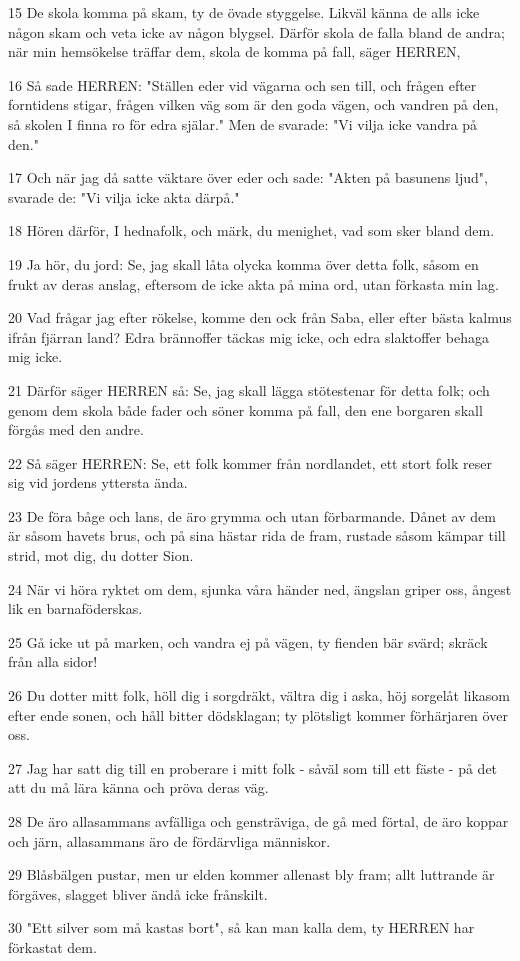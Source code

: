\par 15 De skola komma på skam, ty de övade styggelse. Likväl känna de alls icke någon skam och veta icke av någon blygsel. Därför skola de falla bland de andra; när min hemsökelse träffar dem, skola de komma på fall, säger HERREN,
\par 16 Så sade HERREN: "Ställen eder vid vägarna och sen till, och frågen efter forntidens stigar, frågen vilken väg som är den goda vägen, och vandren på den, så skolen I finna ro för edra själar." Men de svarade: "Vi vilja icke vandra på den."
\par 17 Och när jag då satte väktare över eder och sade: "Akten på basunens ljud", svarade de: "Vi vilja icke akta därpå."
\par 18 Hören därför, I hednafolk, och märk, du menighet, vad som sker bland dem.
\par 19 Ja hör, du jord: Se, jag skall låta olycka komma över detta folk, såsom en frukt av deras anslag, eftersom de icke akta på mina ord, utan förkasta min lag.
\par 20 Vad frågar jag efter rökelse, komme den ock från Saba, eller efter bästa kalmus ifrån fjärran land? Edra brännoffer täckas mig icke, och edra slaktoffer behaga mig icke.
\par 21 Därför säger HERREN så: Se, jag skall lägga stötestenar för detta folk; och genom dem skola både fader och söner komma på fall, den ene borgaren skall förgås med den andre.
\par 22 Så säger HERREN: Se, ett folk kommer från nordlandet, ett stort folk reser sig vid jordens yttersta ända.
\par 23 De föra båge och lans, de äro grymma och utan förbarmande. Dånet av dem är såsom havets brus, och på sina hästar rida de fram, rustade såsom kämpar till strid, mot dig, du dotter Sion.
\par 24 När vi höra ryktet om dem, sjunka våra händer ned, ängslan griper oss, ångest lik en barnaföderskas.
\par 25 Gå icke ut på marken, och vandra ej på vägen, ty fienden bär svärd; skräck från alla sidor!
\par 26 Du dotter mitt folk, höll dig i sorgdräkt, vältra dig i aska, höj sorgelåt likasom efter ende sonen, och håll bitter dödsklagan; ty plötsligt kommer förhärjaren över oss.
\par 27 Jag har satt dig till en proberare i mitt folk - såväl som till ett fäste - på det att du må lära känna och pröva deras väg.
\par 28 De äro allasammans avfälliga och gensträviga, de gå med förtal, de äro koppar och järn, allasammans äro de fördärvliga människor.
\par 29 Blåsbälgen pustar, men ur elden kommer allenast bly fram; allt luttrande är förgäves, slagget bliver ändå icke frånskilt.
\par 30 "Ett silver som må kastas bort", så kan man kalla dem, ty HERREN har förkastat dem.

